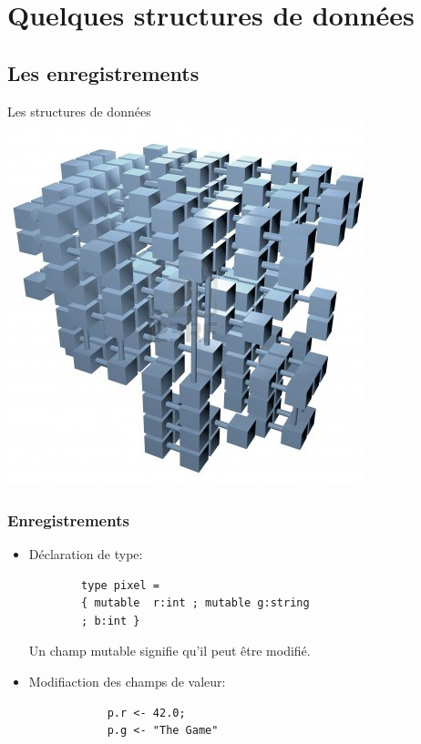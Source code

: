 
\section{Quelques structures de données}
\subsection{Les enregistrements}

\begin{frame}
	\begin{center}
		\huge  Les structures de données
		\includegraphics[scale=0.6]{pics/struct.jpg}
	\end{center}
\end{frame}


\begin{frame}[fragile]
	\frametitle{Enregistrements}
	\begin{itemize}
	\item Déclaration de type: 
		\begin{lstlisting}
		type pixel = 
		{ mutable  r:int ; mutable g:string 
		; b:int } 
		\end{lstlisting}
		Un champ mutable signifie qu'il peut être modifié.
	
	\item Modifiaction des champs de valeur:
		\begin{lstlisting}
			p.r <- 42.0;
			p.g <- "The Game"
		\end{lstlisting}
\end{itemize}
\end{frame}


